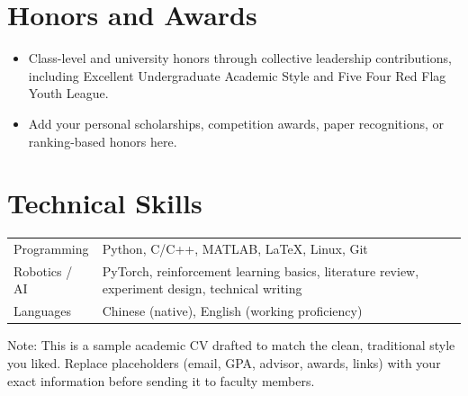 \documentclass[10pt,a4paper]{article}
\newcommand{\cvitem}[1]{\item \small #1}
\begin{document}
\section*{Honors and Awards}
\begin{itemize}[leftmargin=1.2em, topsep=0.2em, itemsep=0.18em]
  \cvitem{Class-level and university honors through collective leadership contributions, including Excellent Undergraduate Academic Style and Five Four Red Flag Youth League.}
  \cvitem{Add your personal scholarships, competition awards, paper recognitions, or ranking-based honors here.}
\end{itemize}

\section*{Technical Skills}
\begin{tabularx}{\textwidth}{@{}p{}X@{}}
Programming & Python, C/C++, MATLAB, LaTeX, Linux, Git \\
Robotics / AI & PyTorch, reinforcement learning basics, literature review, experiment design, technical writing \\
Languages & Chinese (native), English (working proficiency) \\
\end{tabularx}

\vspace{0.6em}
{\footnotesize\color{textgray}Note: This is a sample academic CV drafted to match the clean, traditional style you liked. Replace placeholders (email, GPA, advisor, awards, links) with your exact information before sending it to faculty members.}
\end{document}
